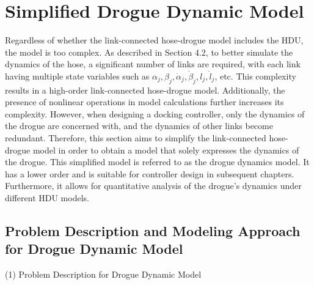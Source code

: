 \section{Simplified Drogue Dynamic Model}
Regardless of whether the link-connected hose-drogue model includes the HDU, the model is too complex. As described in Section 4.2, to better simulate the dynamics of the hose, a significant number of links are required, with each link having multiple state variables such as ${\alpha _j},{\beta _j},{\dot \alpha _j},{\dot \beta _j},{l_j},{\dot l_j}$, etc. This complexity results in a high-order link-connected hose-drogue model. Additionally, the presence of nonlinear operations in model calculations further increases its complexity. However, when designing a docking controller, only the dynamics of the drogue are concerned with, and the dynamics of other links become redundant. Therefore, this section aims to simplify the link-connected hose-drogue model in order to obtain a model that solely expresses the dynamics of the drogue. This simplified model is referred to as the drogue dynamics model. It has a lower order and is suitable for controller design in subsequent chapters. Furthermore, it allows for quantitative analysis of the drogue's dynamics under different HDU models.

\subsection{Problem Description and Modeling Approach for Drogue Dynamic Model}

(1) Problem Description for Drogue Dynamic Model

